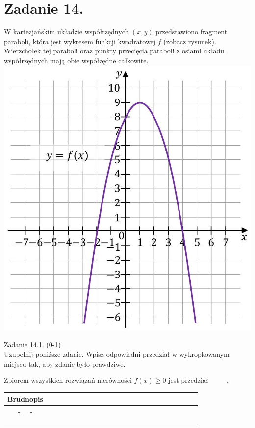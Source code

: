 \documentclass[10pt]{article}
\begin{document}
\section*{Zadanie 14.}
W kartezjańskim układzie współrzędnych \((x, y)\) przedstawiono fragment paraboli, która jest wykresem funkcji kwadratowej \(f\) (zobacz rysunek). Wierzchołek tej paraboli oraz punkty przecięcia paraboli z osiami układu współrzędnych mają obie współzędne całkowite.\\
\includegraphics[max width=\textwidth, center]{2024_11_21_daeb5e5efb43dd4cb535g-13(1)}

Zadanie 14.1. (0-1)\\
Uzupełnij poniższe zdanie. Wpisz odpowiedni przedział w wykropkowanym miejscu tak, aby zdanie było prawdziwe.

Zbiorem wszystkich rozwiązań nierówności \(f(x) \geq 0\) jest przedział \(\qquad\) .

\begin{center}
\begin{tabular}{|c|c|c|c|c|c|c|c|c|c|c|c|c|c|c|c|c|c|c|c|c|c|c|c|c|c|}
\hline
\multicolumn{4}{|l|}{Brudnopis} &  &  &  &  &  &  &  &  &  &  &  &  &  &  &  &  &  &  &  &  &  &  \\
\hline
 & - & - &  &  &  &  &  &  &  &  &  &  &  &  &  &  &  &  &  &  &  &  &  &  &  \\
\hline
 &  &  &  &  &  &  &  &  &  &  &  &  &  &  &  &  &  &  &  &  &  &  &  &  &  \\
\hline
 &  &  &  &  &  &  &  &  &  &  &  &  &  &  &  &  &  &  &  &  &  &  &  &  &  \\
\hline
\end{tabular}
\end{center}
\end{document}
